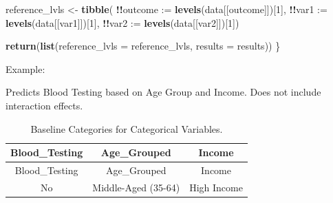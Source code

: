 \documentclass[
]{article}
\newenvironment{Shaded}{\begin{snugshade}}{\end{snugshade}}
\newcommand{\AttributeTok}[1]{\textcolor[rgb]{0.13,0.29,0.53}{#1}}
\newcommand{\DecValTok}[1]{\textcolor[rgb]{0.00,0.00,0.81}{#1}}
\newcommand{\FunctionTok}[1]{\textcolor[rgb]{0.13,0.29,0.53}{\textbf{#1}}}
\newcommand{\NormalTok}[1]{#1}
\newcommand{\OtherTok}[1]{\textcolor[rgb]{0.56,0.35,0.01}{#1}}
\newcommand{\SpecialCharTok}[1]{\textcolor[rgb]{0.81,0.36,0.00}{\textbf{#1}}}
\begin{document}
\begin{Shaded}
\begin{Highlighting}[]
\NormalTok{  reference\_lvls }\OtherTok{\textless{}{-}} \FunctionTok{tibble}\NormalTok{(}
    \SpecialCharTok{!!}\AttributeTok{outcome :=} \FunctionTok{levels}\NormalTok{(data[[outcome]])[}\DecValTok{1}\NormalTok{],}
    \SpecialCharTok{!!}\AttributeTok{var1 :=} \FunctionTok{levels}\NormalTok{(data[[var1]])[}\DecValTok{1}\NormalTok{],}
    \SpecialCharTok{!!}\AttributeTok{var2 :=} \FunctionTok{levels}\NormalTok{(data[[var2]])[}\DecValTok{1}\NormalTok{])}
  
  \FunctionTok{return}\NormalTok{(}\FunctionTok{list}\NormalTok{(}\AttributeTok{reference\_lvls =}\NormalTok{ reference\_lvls, }\AttributeTok{results =}\NormalTok{ results))}
\NormalTok{\}}
\end{Highlighting}
\end{Shaded}

Example:

Predicts Blood Testing based on Age Group and Income. Does not include
interaction effects.

\begin{longtable}[]{@{}ccc@{}}
\caption{Baseline Categories for Categorical Variables.}\tabularnewline
\toprule\noalign{}
Blood\_Testing & Age\_Grouped & Income \\
\midrule\noalign{}
\endfirsthead
\toprule\noalign{}
Blood\_Testing & Age\_Grouped & Income \\
\midrule\noalign{}
\endhead
\bottomrule\noalign{}
\endlastfoot
No & Middle-Aged (35-64) & High Income \\
\end{longtable}
\end{document}
